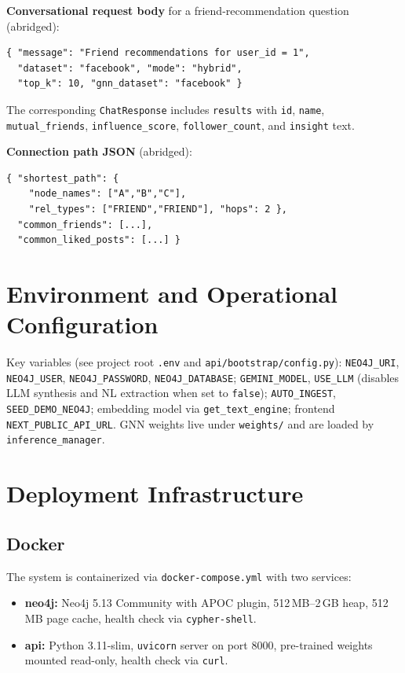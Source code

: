 \documentclass[conference]{IEEEtran}
\begin{document}
\noindent\textbf{Conversational request body} for a friend-recommendation question (abridged):
\begin{lstlisting}[basicstyle=\ttfamily\tiny]
{ "message": "Friend recommendations for user_id = 1",
  "dataset": "facebook", "mode": "hybrid",
  "top_k": 10, "gnn_dataset": "facebook" }
\end{lstlisting}
The corresponding \texttt{ChatResponse} includes \texttt{results} with \texttt{id}, \texttt{name}, \texttt{mutual\_friends}, \texttt{influence\_score}, \texttt{follower\_count}, and \texttt{insight} text.

\noindent\textbf{Connection path JSON} (abridged):
\begin{lstlisting}[basicstyle=\ttfamily\tiny]
{ "shortest_path": {
    "node_names": ["A","B","C"],
    "rel_types": ["FRIEND","FRIEND"], "hops": 2 },
  "common_friends": [...],
  "common_liked_posts": [...] }
\end{lstlisting}

\section{Environment and Operational Configuration}
Key variables (see project root \texttt{.env} and \texttt{api/bootstrap/config.py}): \texttt{NEO4J\_URI}, \texttt{NEO4J\_USER}, \texttt{NEO4J\_PASSWORD}, \texttt{NEO4J\_DATABASE}; \texttt{GEMINI\_MODEL}, \texttt{USE\_LLM} (disables LLM synthesis and NL extraction when set to \texttt{false}); \texttt{AUTO\_INGEST}, \texttt{SEED\_DEMO\_NEO4J}; embedding model via \texttt{get\_text\_engine}; frontend \texttt{NEXT\_PUBLIC\_API\_URL}. GNN weights live under \texttt{weights/} and are loaded by \texttt{inference\_manager}.

\section{Deployment Infrastructure}

\subsection{Docker}
The system is containerized via \texttt{docker-compose.yml} with two services:
\begin{itemize}
  \item \textbf{neo4j:} Neo4j 5.13 Community with APOC plugin, 512\,MB--2\,GB heap, 512\,MB page cache, health check via \texttt{cypher-shell}.
  \item \textbf{api:} Python 3.11-slim, \texttt{uvicorn} server on port 8000, pre-trained weights mounted read-only, health check via \texttt{curl}.
\end{itemize}
\end{document}
